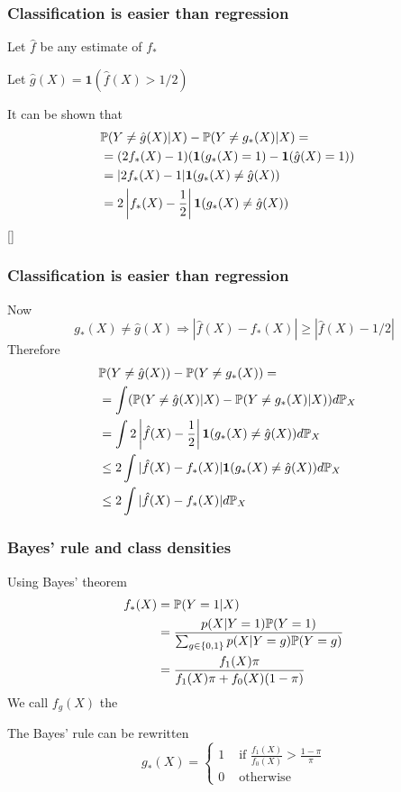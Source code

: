 \documentclass[12pt]{beamer}
\begin{document}
\begin{frame}
\frametitle{Classification is easier than regression}
Let $\hat{f}$ be any estimate of $f_*$

\vsp
Let $\hat{g}(X) = \mathbf{1}(\hat{f}(X) > 1/2)$

\vsp
It can be shown that
\begin{align*}
  \lefteqn{\P(Y \neq \hat{g}(X) | X) - \P(Y \neq g_*(X) | X) =}  \\
  & = 
(2f_*(X) - 1)(\mathbf{1}(g_*(X) = 1) - \mathbf{1}(\hat{g}(X) = 1)) \\
& = |2f_*(X) - 1|\mathbf{1}(g_*(X)\neq \hat{g}(X))  \\
& =  2\left|f_*(X) - \frac{1}{2}\right|\mathbf{1}(g_*(X)\neq \hat{g}(X)) 
\end{align*}
[]
\end{frame}

\begin{frame}
\frametitle{Classification is easier than regression}
Now
\[
g_*(X)\neq \hat{g}(X) \Rightarrow |\hat{f}(X) - f_*(X)| \geq |\hat{f}(X) - 1/2|
\]
Therefore
\begin{align*}
 \lefteqn{\P(Y \neq \hat{g}(X)) - \P(Y \neq g_*(X)) =}\\
& =  \int(\P(Y \neq \hat{g}(X) | X) - \P(Y \neq g_*(X) | X))d\P_X   \\
& =  \int 2\left|\hat{f}(X) - \frac{1}{2}\right|\mathbf{1}(g_*(X)\neq \hat{g}(X))d\P_X  \\
& \leq  2\int |\hat{f}(X) - f_*(X)| \mathbf{1}(g_*(X)\neq \hat{g}(X))d\P_X \\
& \leq  2\int |\hat{f}(X) - f_*(X)|d\P_X 
\end{align*}
\pause
{}
\end{frame}

\begin{frame}
\frametitle{Bayes' rule and class densities}
Using Bayes' theorem
\begin{align*}
f_*(X) & = \P(Y = 1 | X) \\
& =
\frac{p(X|Y = 1) \P(Y = 1)}{\sum_{g \in \{0,1\}} p(X|Y = g) \P(Y = g)} \\
& =
\frac{f_1(X) \pi}{ f_1(X)\pi + f_0(X)(1-\pi)}
\end{align*}
We call $f_g(X)$ the 

\vsp
The Bayes' rule can be rewritten
\[
g_*(X) = 
\begin{cases}
1 & \textrm{ if } \frac{f_1(X)}{f_0(X)} > \frac{1-\pi}{\pi} \\
0  &  \textrm{ otherwise}
\end{cases}
\]
\end{frame}
\end{document}

